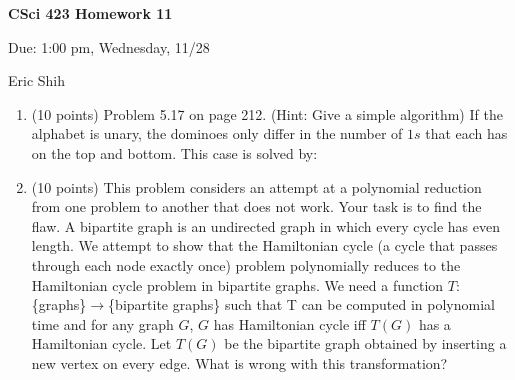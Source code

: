\documentclass[11pt]{article}
\begin{document}
\begin{LARGE}
\centerline {\bf CSci 423 Homework 11}
\end{LARGE}
\vskip 0.25cm

\centerline{Due: 1:00 pm, Wednesday, 11/28}
\centerline{Eric Shih}

\begin{enumerate}
  \item (10 points) Problem 5.17 on page 212. (Hint: Give a simple algorithm)
	If the alphabet is unary, the dominoes only differ in the number of $1s$ that each has on the top and bottom. This case is
	solved by:


  \item (10 points) This problem considers an attempt at a polynomial reduction from one problem to another that does not work.
	Your task is to find the flaw. A bipartite graph is an undirected graph in which every cycle has even length. We attempt
	to show that the Hamiltonian cycle (a cycle that passes through each node exactly once) problem polynomially reduces to the
	Hamiltonian cycle problem in bipartite graphs. We need a function $T$: \{graphs\}$\rightarrow$\{bipartite graphs\} such that
	T can be computed in polynomial time and for any graph $G$, $G$ has Hamiltonian cycle iff $T(G)$ has a Hamiltonian cycle.
	Let $T(G)$ be the bipartite graph obtained by inserting a new vertex on every edge. What is wrong with this transformation? \\


\end{enumerate}
\end{document}
